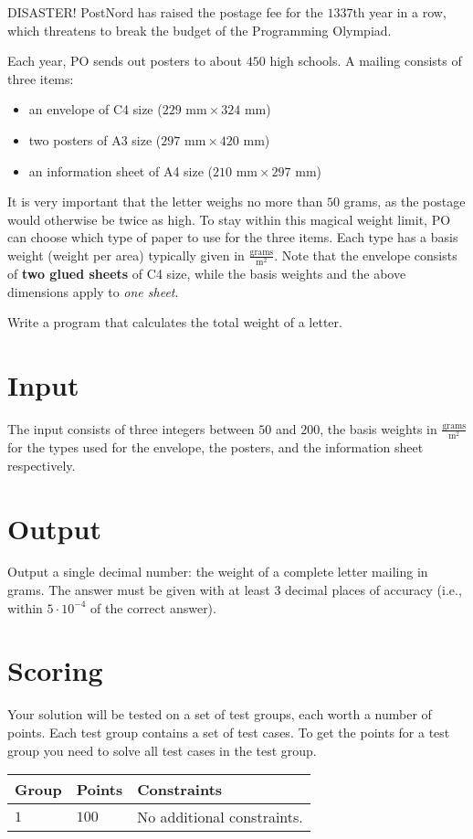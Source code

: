 \noindent
DISASTER!
PostNord has raised the postage fee for the $1337$th year in a row, which threatens to break the budget of the Programming Olympiad.

Each year, PO sends out posters to about $450$ high schools.
A mailing consists of three items:
\begin{itemize}
\item an envelope of C4 size ($229\text{ mm} \times 324\text{ mm}$)
\item two posters of A3 size ($297\text{ mm} \times 420\text{ mm}$)
\item an information sheet of A4 size ($210\text{ mm} \times 297\text{ mm}$)
\end{itemize}

It is very important that the letter weighs no more than $50$ grams, as the postage would otherwise be twice as high.
To stay within this magical weight limit, PO can choose which type of paper to use for the three items.
Each type has a basis weight (weight per area) typically given in $\frac{\text{grams}}{\text{m}^2}$.
Note that the envelope consists of \textbf{two glued sheets} of C4 size, while the basis weights and the above dimensions apply to \emph{one sheet}.

Write a program that calculates the total weight of a letter.

\section*{Input}
The input consists of three integers between $50$ and $200$, the basis weights in $\frac{\text{grams}}{\text{m}^2}$ for the types used for the envelope, the posters, and the information sheet respectively.

\section*{Output}
Output a single decimal number: the weight of a complete letter mailing in grams.
The answer must be given with at least $3$ decimal places of accuracy (i.e., within $5 \cdot 10^{-4}$ of the correct answer).

\section*{Scoring}
Your solution will be tested on a set of test groups, each worth a number of points. Each test group contains
a set of test cases. To get the points for a test group you need to solve all test cases in the test group.

\noindent
\begin{tabular}{| l | l | p{12cm} |}
  \hline
  \textbf{Group} & \textbf{Points} & \textbf{Constraints} \\ \hline
  $1$    & $100$     & No additional constraints. \\ \hline
\end{tabular}
